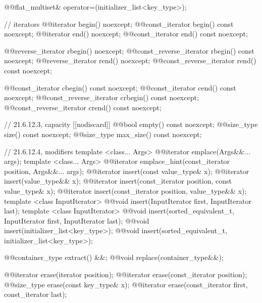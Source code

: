 \begin{codeblock}
{    @@flat_multiset& operator=(initializer_list<key_type>);

    // iterators
    @@iterator               begin() noexcept;
    @@const_iterator         begin() const noexcept;
    @@iterator               end() noexcept;
    @@const_iterator         end() const noexcept;

    @@reverse_iterator       rbegin() noexcept;
    @@const_reverse_iterator rbegin() const noexcept;
    @@reverse_iterator       rend() noexcept;
    @@const_reverse_iterator rend() const noexcept;

    @@const_iterator         cbegin() const noexcept;
    @@const_iterator         cend() const noexcept;
    @@const_reverse_iterator crbegin() const noexcept;
    @@const_reverse_iterator crend() const noexcept;

    // 21.6.12.3, capacity
    [[nodiscard]] @@bool empty() const noexcept;
    @@size_type size() const noexcept;
    @@size_type max_size() const noexcept;

    // 21.6.12.4, modifiers
    template <class... Args> @@iterator emplace(Args&&... args);
    template <class... Args>
      @@iterator emplace_hint(const_iterator position, Args&&... args);
    @@iterator insert(const value_type& x);
    @@iterator insert(value_type&& x);
    @@iterator insert(const_iterator position, const value_type& x);
    @@iterator insert(const_iterator position, value_type&& x);
    template <class InputIterator>
      @@void insert(InputIterator first, InputIterator last);
    template <class InputIterator>
      @@void insert(sorted_equivalent_t, InputIterator first, InputIterator last);
    @@void insert(initializer_list<key_type>);
    @@void insert(sorted_equivalent_t, initializer_list<key_type>);

    @@container_type extract() &&;
    @@void replace(container_type&&);

    @@iterator erase(iterator position);
    @@iterator erase(const_iterator position);
    @@size_type erase(const key_type& x);
    @@iterator erase(const_iterator first, const_iterator last);

}
\end{codeblock}
